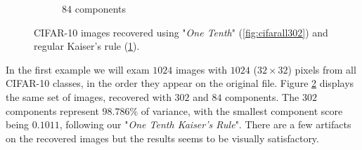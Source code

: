 \documentclass{article} %
\begin{document}
\begin{figure}[h]
\begin{subfigure}{.5\textwidth}
  \caption{$84$ components}
  \label{fig:cifarall84}
\end{subfigure}
\caption{CIFAR-10 images recovered using "\emph{One Tenth}" (\ref{fig:cifarall302}) and regular Kaiser's rule (\ref{fig:cifarall84}).}
\label{fig:sampleCifar10}
\end{figure}

In the first example we will exam $1024$ images with $1024$ ($32\times 32$) pixels from all CIFAR-10 classes, in the order they appear on the original file. Figure \ref{fig:sampleCifar10} displays the same set of images, recovered with $302$ and $84$ components. The $302$ components represent $98.786\%$ of variance, with the smallest component score being $0.1011$, following our "\emph{One Tenth Kaiser's Rule}". There are a few artifacts on the recovered images but the results seems to be visually satisfactory.\par
\end{document}
